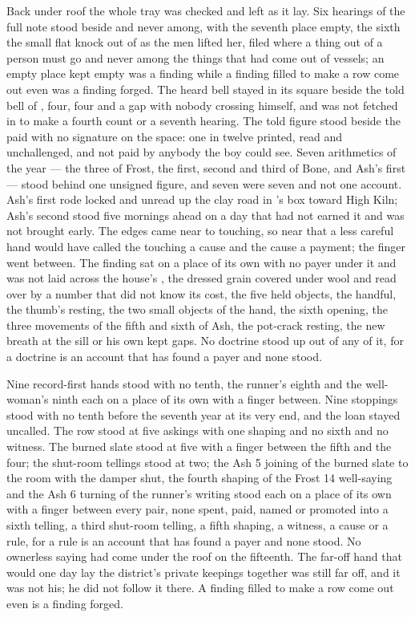 Back under  roof the whole tray was checked and left as it lay. Six hearings of the full note stood beside and never among, with the seventh place empty, the sixth the small flat knock out of  as the men lifted her, filed where a thing out of a person must go and never among the things that had come out of vessels; an empty place kept empty was a finding while a finding filled to make a row come out even was a finding forged. The heard bell stayed in its square beside the told bell of , four, four and a gap with nobody crossing himself, and was not fetched in to make a fourth count or a seventh hearing. The told figure stood beside the paid with no signature on the space: one in twelve printed, read and unchallenged, and not paid by anybody the boy could see. Seven arithmetics of the year --- the three of Frost, the first, second and third of Bone, and Ash's first --- stood behind one unsigned figure, and seven were seven and not one account. Ash's first rode locked and unread up the clay road in 's box toward High Kiln; Ash's second stood five mornings ahead on a day that had not earned it and was not brought early. The edges came near to touching, so near that a less careful hand would have called the touching a cause and the cause a payment; the finger went between. The finding sat on a place of its own with no payer under it and was not laid across the house's , the dressed grain covered under wool and read over by a number that did not know its cost, the five held objects, the handful, the thumb's resting, the two small objects of the hand, the sixth opening, the three movements of the fifth and sixth of Ash, the pot-crack resting, the new breath at the sill or his own kept gaps. No doctrine stood up out of any of it, for a doctrine is an account that has found a payer and none stood.

Nine record-first hands stood with no tenth, the runner's eighth and the well-woman's ninth each on a place of its own with a finger between. Nine stoppings stood with no tenth before the seventh year at its very end, and the loan stayed uncalled. The row stood at five askings with one shaping and no sixth and no witness. The burned slate stood at five with a finger between the fifth and the four; the shut-room tellings stood at two; the Ash 5 joining of the burned slate to the room with the damper shut, the fourth shaping of the Frost 14 well-saying and the Ash 6 turning of the runner's writing stood each on a place of its own with a finger between every pair, none spent, paid, named or promoted into a sixth telling, a third shut-room telling, a fifth shaping, a witness, a cause or a rule, for a rule is an account that has found a payer and none stood. No ownerless saying had come under the roof on the fifteenth. The far-off hand that would one day lay the district's private keepings together was still far off, and it was not his; he did not follow it there. A finding filled to make a row come out even is a finding forged.

